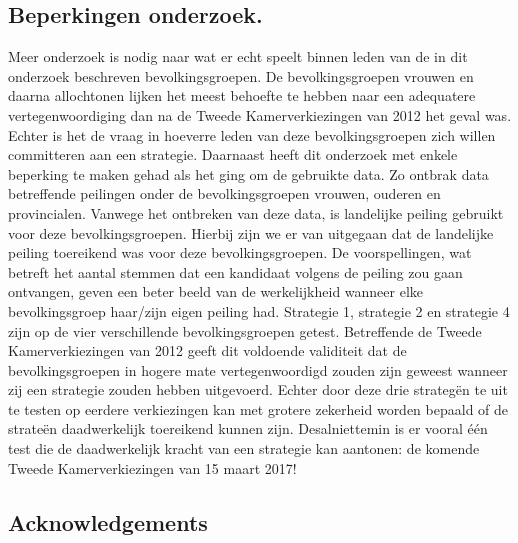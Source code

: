 \subsection*{Beperkingen onderzoek.}
Meer onderzoek is nodig naar wat er echt speelt binnen leden van de in dit onderzoek beschreven bevolkingsgroepen. De bevolkingsgroepen vrouwen en daarna allochtonen lijken het meest behoefte te hebben naar een adequatere vertegenwoordiging dan na de Tweede Kamerverkiezingen van 2012 het geval was. Echter is het de vraag in hoeverre leden van deze bevolkingsgroepen zich willen committeren aan een strategie. Daarnaast heeft dit onderzoek met enkele beperking te maken gehad als het ging om de gebruikte data. Zo ontbrak data betreffende peilingen onder de bevolkingsgroepen vrouwen, ouderen en provincialen. Vanwege het ontbreken van deze data, is landelijke peiling gebruikt voor deze bevolkingsgroepen. Hierbij zijn we er van uitgegaan dat de landelijke peiling toereikend was voor deze bevolkingsgroepen. De voorspellingen, wat betreft het aantal stemmen dat een kandidaat volgens de peiling zou gaan ontvangen, geven een beter beeld van de werkelijkheid wanneer elke bevolkingsgroep haar/zijn eigen peiling had. Strategie 1, strategie 2 en strategie 4 zijn op de vier verschillende bevolkingsgroepen getest. Betreffende de Tweede Kamerverkiezingen van 2012 geeft dit voldoende validiteit dat de bevolkingsgroepen in hogere mate vertegenwoordigd zouden zijn geweest wanneer zij een strategie zouden hebben uitgevoerd. Echter door deze drie strateg\"{e}n te uit te testen op eerdere verkiezingen kan met grotere zekerheid worden bepaald of de strate\"{e}n daadwerkelijk toereikend kunnen zijn. Desalniettemin is er vooral één test die de daadwerkelijk kracht van een strategie kan aantonen: de komende Tweede Kamerverkiezingen van 15 maart 2017!


\subsection{Acknowledgements}




























